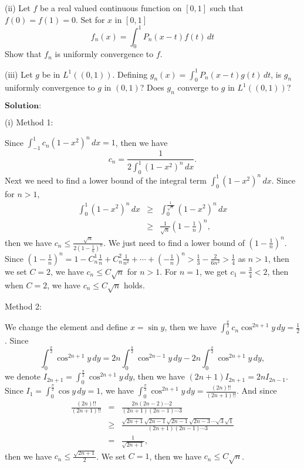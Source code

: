 \documentclass[12pt,a4paper]{ctexart}
\begin{document}
(ii) Let $f$ be a real valued continuous function on $[0, 1]$ such that $f(0) = f(1) = 0$. Set for $x$ in $[0, 1]$
\begin{equation*}
    f_{n}(x) = \int_{0}^{1} P_{n}(x-t) f(t) \, d t
\end{equation*}
Show that $f_{n}$ is uniformly convergence to $f$.

(iii) Let $g$ be in $L^{1}((0, 1))$. Defining $g_{n}(x) = \int_{0}^{1} P_{n} (x- t) g(t) \, d t$, is $g_{n}$ uniformly convergence to $g$ in $(0, 1)$? Does $g_{n}$ converge to $g$ in $L^{1}((0, 1))$?

\vspace{8pt}
$\textbf{Solution:}$

(i) Method 1:

Since $\int_{-1}^{1} c_{n} (1-x^{2})^{n}\, d x = 1$, then we have
\begin{equation*}
   c_{n} = \frac{1}{2 \int_{0}^{1}(1-x^{2})^{n} \, d x }.
\end{equation*}
Next we need to find a lower bound of the integral term $\int_{0}^{1}(1-x^{2})^{n} \, d x$. Since for $n > 1$,
\begin{eqnarray*}
\int_{0}^{1}(1-x^{2})^{n} \, d x &\geq& \int_{0}^{\frac{1}{\sqrt{n}}}(1-x^{2})^{n} \, d x  \\
            &\geq& \frac{1}{\sqrt{n}} (1 - \frac{1}{n})^{n},
\end{eqnarray*}
then we have $c_{n} \leq \frac{\sqrt{n}}{2 (1-\frac{1}{n})^{n}}$. We just need to find a lower bound of $(1 - \frac{1}{n})^{n}$. Since $(1 - \frac{1}{n})^{n} = 1 - C_{n}^{1} \frac{1}{n} + C_{n}^{2} \frac{1}{n^{2}} + \cdots + (-\frac{1}{n})^{n} > \frac{1}{3} - \frac{2}{6n^{2}}  > \frac{1}{4}$ as $n > 1$, then we set $C = 2$, we have $c_{n} \leq C \sqrt{n}$ for $n>1$. For $n = 1$, we get $c_{1} = \frac{3}{4} < 2$, then when $C = 2$, we have $c_{n} \leq C \sqrt{n}$ holds.

Method 2:

We change the element and define $x = \sin y$, then we have $\int_{0}^{\frac{\pi}{2}}  c_{n} \cos^{2n+1}y \, d y = \frac{1}{2}$. Since 
\begin{equation*}
   \int_{0}^{\frac{\pi}{2}} \cos^{2n+1}y \, d y = 2n \int_{0}^{\frac{\pi}{2}} \cos^{2n-1}y \, d y - 2n \int_{0}^{\frac{\pi}{2}} \cos^{2n+1}y \, d y,
\end{equation*}
we denote $I_{2n + 1} = \int_{0}^{\frac{\pi}{2}} \cos^{2n+1}y \, d y$, then we have $(2n + 1)I_{2n+1} = 2n I_{2n-1}$. Since $I_{1} = \int_{0}^{\frac{\pi}{2}} \cos y \, d y = 1$, we have $\int_{0}^{\frac{\pi}{2}} \cos^{2n+1}y \, d y = \frac{(2n)!!}{(2n+1)!!}$. And since
\begin{eqnarray*}
\frac{(2n)!!}{(2n+1)!!} &=&  \frac{2n (2n-2) \cdots 2}{(2n+1) (2n-1) \cdots 3}  \\
            &\geq& \frac{\sqrt{2n+1}\sqrt{2n-1}\sqrt{2n-1}\sqrt{2n-3} \cdots \sqrt{3}\sqrt{1}}{(2n+1) (2n-1) \cdots 3} \\
            &=& \frac{1}{\sqrt{2n+1}},
\end{eqnarray*}
then we have $c_{n} \leq \frac{\sqrt{2n+1}}{2}$. We set $C = 1$, then we have $c_{n} \leq C \sqrt{n}$.
\end{document}
